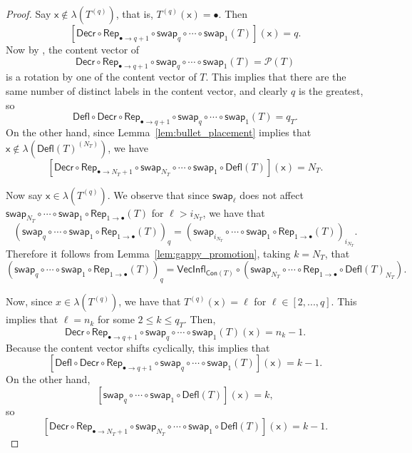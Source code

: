 \documentclass[12pt]{amsart}
\newcommand{\x}{\ensuremath{\mathsf{x}}}
\theoremstyle{definition}
\theoremstyle{remark}
\numberwithin{equation}{section}
\newcommand{\pro}{\mathcal{P}}
\newcommand{\swap}{\ensuremath{\mathsf{swap}}}
\newcommand{\decr}{\ensuremath{\mathsf{Decr}}}
\newcommand{\rep}{\ensuremath{\mathsf{Rep}}}
\newcommand{\deflate}{\ensuremath{\mathsf{Defl}}}
\newcommand{\inflate}{\ensuremath{\mathsf{VecInfl}}}
\newcommand{\content}{\ensuremath{\mathsf{Con}}}
\begin{document}
\begin{proof}
Say $\x \not \in \lambda(T^{(q)})$, that is,  $T^{(q)}(\x) = \bullet$.  Then 
\[
[\decr \circ \rep_{\bullet \rightarrow q+1} \circ \swap_q \circ \cdots \circ \swap_1 (T)](\x) = q.
\]
Now by \cite[Lemma~2.1]{DPS}, the content vector of  
\[
\decr \circ \rep_{\bullet \rightarrow q+1} \circ \swap_q \circ \cdots \circ \swap_1 (T) = \pro(T)
\]
 is a rotation by one of the content vector of $T$. This implies that there are the same number of distinct labels in the content vector, and clearly $q$ is the greatest, so 
 \[
 \deflate \circ \decr \circ \rep_{\bullet \rightarrow q+1} \circ \swap_q \circ \cdots \circ \swap_1 (T) = q_T.
 \]
  On the other hand, since Lemma~\ref{lem:bullet_placement} implies that $\x \not \in \lambda(\deflate(T)^{(N_T)})$, we have
  \[
  [\decr \circ \rep_{\bullet \rightarrow N_T + 1} \circ \swap_{N_T} \circ \cdots \circ \swap_1 \circ \deflate(T)](\x) = N_T.
  \] 

Now say $\x \in \lambda(T^{(q)})$. We observe that since $\swap_\ell$ does not affect $\swap_{N_T} \circ \cdots \circ \swap_1 \circ \rep_{1 \rightarrow \bullet} (T)$ for $\ell > i_{N_T}$, we have that
\[ (\swap_q \circ \cdots \circ \swap_1 \circ \rep_{1 \rightarrow \bullet}( T ))_q = (\swap_{i_{N_T}} \circ \cdots \circ \swap_1 \circ \rep_{1 \rightarrow \bullet}( T ))_{i_{N_T}}.  \]
Therefore it follows from Lemma~\ref{lem:gappy_promotion}, taking $k = N_T$, that 
\[ (\swap_q \circ \cdots \circ \swap_1 \circ \rep_{1 \rightarrow \bullet}( T ))_q = \inflate_{\content(T)} \circ (\swap_{N_T} \circ \cdots \circ  \rep_{1 \rightarrow \bullet} \circ \deflate(T)_{N_T}). \]

Now, since $x \in \lambda(T^{(q)})$, we have that $T^{(q)}(\x) = \ell$ for $\ell \in [2,...,q]$. This implies that $\ell = n_k$ for some $2 \leq k \leq q_T$. Then, 
\[
\decr \circ \rep_{\bullet \to q+1} \circ \swap_q \circ \cdots \circ \swap_1 (T)(\x) = n_k-1.
\]
Because the content vector shifts cyclically, this implies that 
 \[
 [\deflate \circ \decr \circ \rep_{\bullet \rightarrow q+1} \circ \swap_q \circ \cdots \circ \swap_1 (T)](\x) = k-1.
 \]
  On the other hand, 
  \[
  [\swap_q \circ \cdots \circ \swap_1 \circ \deflate(T)](\x) = k,
  \]
   so 
   \[
   [\decr \circ \rep_{\bullet \rightarrow N_T + 1} \circ \swap_{N_T} \circ \cdots \circ \swap_1 \circ  \deflate(T)](\x) = k-1.\]
\end{proof}
\end{document}

